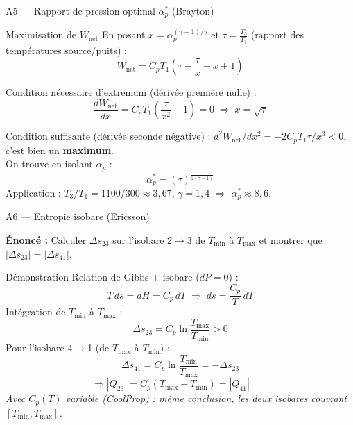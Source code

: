 \documentclass[aspectratio=43, 10pt]{beamer}
\newcommand{\Tmin}{T_{\min}}
\newcommand{\Tmax}{T_{\max}}
\newcommand{\rp}{\alpha_p}
\newcommand{\Wnet}{W_{\text{net}}}
\begin{document}
\begin{frame}{A5 --- Rapport de pression optimal $\rp^*$ (Brayton)}

  \begin{block}{Maximisation de $\Wnet$}
    \small
    En posant $x = \rp^{(\gamma-1)/\gamma}$ et
    $\tau = \frac{T_3}{T_1}$ (rapport des temp\'eratures source/puits) :
    \[ \Wnet = C_p T_1\!\left(\tau - \frac{\tau}{x} - x + 1\right) \]
    
    Condition n\'ecessaire d'extremum (d\'eriv\'ee premi\`ere nulle) :
    \[ \frac{d\Wnet}{dx} = C_p T_1\!\left(\frac{\tau}{x^2} - 1\right) = 0 \;\Rightarrow\; x = \sqrt{\tau} \]
    
    Condition suffisante (d\'eriv\'ee seconde n\'egative) :
    $d^2\Wnet/dx^2 = -2C_p T_1\tau/x^3 < 0$, c'est bien un \textbf{maximum}.\\
    On trouve en isolant $\rp$ :
    \[ \boxed{\rp^* = \left(\tau\right)^{\!\!\frac{\gamma}{2(\gamma-1)}}} \]
    Application : $T_3/T_1 = 1100/300 \approx 3{,}67$,
    $\gamma = 1{,}4$ $\Rightarrow$ $\rp^* \approx 8{,}6$.
  \end{block}
\end{frame}

\begin{frame}{A6 --- Entropie isobare (Ericsson)}

  \textbf{\'Enonc\'e :} Calculer $\Delta s_{23}$ sur l'isobare 2$\to$3
  de $\Tmin$ \`a $\Tmax$ et montrer que $|\Delta s_{23}| = |\Delta s_{41}|$.

  \begin{block}{D\'emonstration}
    \small
    Relation de Gibbs + isobare ($dP=0$) :
    \[
      T\,ds = dH = C_p\,dT
      \;\Rightarrow\;
      ds = \frac{C_p}{T}\,dT
    \]
    Int\'egration de $\Tmin$ \`a $\Tmax$ :
    \[
      \Delta s_{23} = C_p\ln\!\frac{\Tmax}{\Tmin} > 0
    \]
    Pour l'isobare 4$\to$1 (de $\Tmax$ \`a $\Tmin$) :
    \[
      \Delta s_{41} = C_p\ln\!\frac{\Tmin}{\Tmax}
      = -\Delta s_{23}
    \]
    \vspace{-6pt}
    \[
      \Rightarrow |Q_{23}| = C_p(\Tmax-\Tmin) = |Q_{41}|
      \qquad
    \]
    \vspace{-4pt}
    \small\textit{Avec $C_p(T)$ variable (CoolProp) : m\^eme
    conclusion, les deux isobares couvrant $[\Tmin,\Tmax]$.}
  \end{block}

\end{frame}
\end{document}

